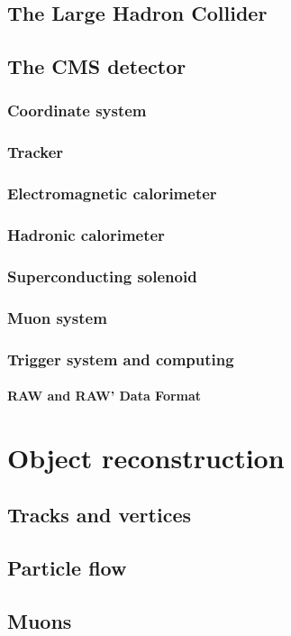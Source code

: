 \documentclass[12pt, a4paper, twoside]{report}
\begin{document}
\section{The Large Hadron Collider}
\section{The CMS detector}
\subsection{Coordinate system}
\subsection{Tracker}
\subsection{Electromagnetic calorimeter}
\subsection{Hadronic calorimeter}
\subsection{Superconducting solenoid}
\subsection{Muon system}
\subsection{Trigger system and computing}
\subsubsection{RAW and RAW' Data Format}

\chapter{Object reconstruction}
\section{Tracks and vertices}
\section{Particle flow}
\section{Muons}
\end{document}
